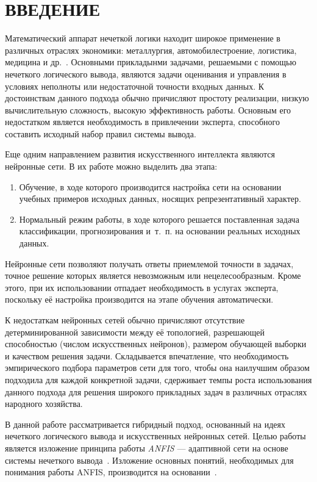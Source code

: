 \section*{ВВЕДЕНИЕ}

Математический аппарат нечеткой логики находит широкое применение
в различных отраслях экономики: металлургия, автомобилестроение,
логистика, медицина и др.~\cite{terano92}.
Основными прикладынми задачами, решаемыми с помощью нечеткого логического вывода,
являются задачи оценивания и управления в условиях неполноты или
недостаточной точности входных данных.
К достоинствам данного подхода обычно причисляют простоту реализации,
низкую вычислительную сложность, высокую эффективность работы.
Основным его недостатком является необходимость в
привлечении эксперта, способного составить исходный набор правил системы вывода.

Еще одним направлением развития искусственного интеллекта являются нейронные сети.
В их работе можно выделить два этапа:
\begin{enumerate}
\item Обучение, в ходе которого производится настройка сети на основании
  учебных примеров исходных данных, носящих репрезентативный характер.
\item Нормальный режим работы, в ходе которого решается поставленная задача
  классификации, прогнозирования и~т.~п. на основании реальных исходных данных.
\end{enumerate}

Нейронные сети позволяют получать ответы приемлемой точности в задачах,
точное решение которых является невозможным или нецелесообразным.
Кроме этого, при их использовании отпадает необходимость в услугах эксперта,
поскольку её настройка производится на этапе обучения автоматически.

К недостаткам нейронных сетей обычно причисляют отсутствие
детерминированной зависимости между её топологией,
разрешающей способностью (числом искусственных нейронов),
размером обучающей выборки и качеством решения задачи.
Складывается впечатление, что необходимость эмпирического подбора параметров сети
для того, чтобы она наилучшим образом подходила для каждой конкретной задачи,
сдерживает темпы роста использования данного подхода для
решения широкого прикладных задач в различных отраслях народного хозяйства.

В данной работе рассматривается гибридный подход,
основанный на идеях нечеткого логического вывода и
искусственных нейронных сетей.
Целью работы является изложение принципа работы \emph{ANFIS} ---
адаптивной сети на основе системы нечеткого
вывода~\cite{Jang93anfis:adaptive-network-based}.
Изложение основных понятий, необходимых для понимания работы ANFIS,
производится на основании~\cite{kruglov2001}.
